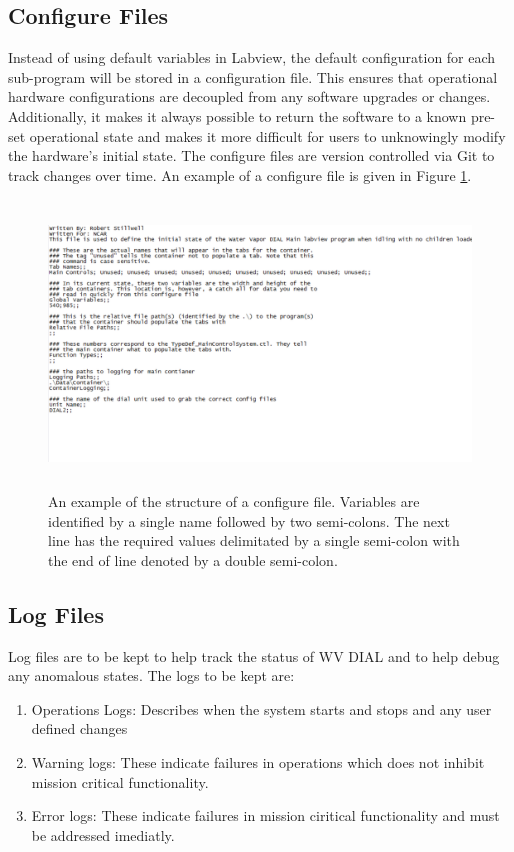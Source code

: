 \subsection{Configure Files}
Instead of using default variables in Labview, the default configuration for each sub-program will be stored in a configuration file. This ensures that operational hardware configurations are decoupled from any software upgrades or changes. Additionally, it makes it always possible to return the software to a known pre-set operational state and makes it more difficult for users to unknowingly modify the hardware's initial state. The configure files are version controlled via Git to track changes over time. An example of a configure file is given in Figure \ref{Fig:ConfigureFile}. 

\begin{figure}[!h]\centering
\includegraphics[height=3in]{Figures/ConfigureFileExample}
\caption{An example of the structure of a configure file. Variables are identified by a single name followed by two semi-colons. The next line has the required values delimitated by a single semi-colon with the end of line denoted by a double semi-colon.}\label{Fig:ConfigureFile}
\end{figure}

\subsection{Log Files}

Log files are to be kept to help track the status of WV DIAL and to help debug any anomalous states. The logs to be kept are:

\begin{enumerate}
\item{Operations Logs: Describes when the system starts and stops and any user defined changes}
\item{Warning logs: These indicate failures in operations which does not inhibit mission critical functionality.}
\item{Error logs: These indicate failures in mission ciritical functionality and must be addressed imediatly.}
\end{enumerate}


